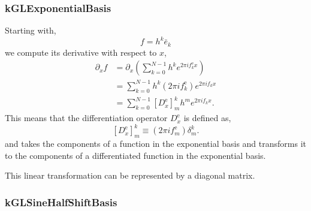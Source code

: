 \documentclass[11pt]{article}
\begin{document}
\subsubsection{kGLExponentialBasis}
Starting with,
\begin{equation}
f = h^k \bar{e}_k
\end{equation}
we compute its derivative with respect to $x$,
\begin{align}
\partial_x f &= \partial_x  \left( \sum_{k=0}^{N-1} h^k e^{2\pi i f_k^{\textrm{e}} x} \right)\\
&=  \sum_{k=0}^{N-1} h^k (2 \pi i f_k^{\textrm{e}} ) e^{2\pi i f_k x} \\
& =  \sum_{k=0}^{N-1} \left[D_x^{\textrm{e}} \right]^k_m h^m e^{2\pi i f_k x}.
\end{align}
This means that the differentiation operator $D_x^{\textrm{e}}$ is defined as,
\begin{equation}
\left[D_x^{\textrm{e}} \right]^k_m \equiv \left( 2 \pi i f_m^{\textrm{e}} \right) \delta_{m}^k .
\end{equation}
and takes the components of a function in the exponential basis and transforms it to the components of a differentiated function in the exponential basis.

This linear transformation can be represented by a diagonal matrix.

\subsubsection{kGLSineHalfShiftBasis}
\end{document}
